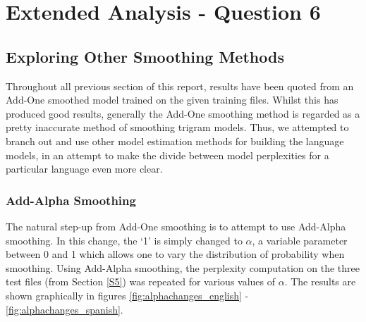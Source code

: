 \documentclass[12pt]{article}
\begin{document}
\section{Extended Analysis - Question 6}
\label{S6}
\subsection{Exploring Other Smoothing Methods}
Throughout all previous section of this report, results have been quoted from an Add-One smoothed model trained on the given training files.  Whilst this has produced good results, generally the Add-One smoothing method is regarded as a pretty inaccurate method of smoothing trigram models.  Thus, we attempted to branch out and use other model estimation methods for building the language models, in an attempt to make the divide between model perplexities for a particular language even more clear.
\subsubsection{Add-Alpha Smoothing}
The natural step-up from Add-One smoothing is to attempt to use Add-Alpha smoothing.  In this change, the `1' is simply changed to $\alpha$, a variable parameter between 0 and 1 which allows one to vary the distribution of probability when smoothing.  Using Add-Alpha smoothing, the perplexity computation on the three test files (from Section \ref{S5}) was repeated for various values of $\alpha$.  The results are shown graphically in figures \ref{fig:alphachanges_english} - \ref{fig:alphachanges_spanish}.
\end{document}
